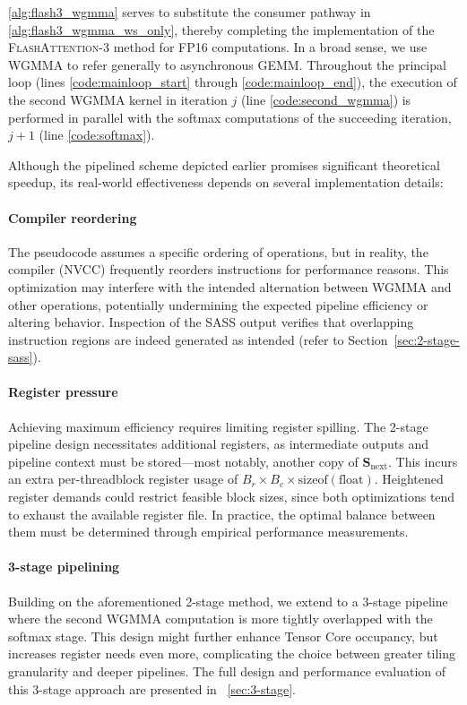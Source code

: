 \begin{enumerate}
\begin{algorithm}[H]
\begin{algorithmic}[1]
\cref{alg:flash3_wgmma} serves to substitute the consumer pathway in \cref{alg:flash3_wgmma_ws_only}, thereby completing the implementation of the \textsc{FlashAttention-3} method for FP16 computations. In a broad sense, we use WGMMA to refer generally to asynchronous GEMM. Throughout the principal loop (lines \ref{code:mainloop_start} through \ref{code:mainloop_end}), the execution of the second WGMMA kernel in iteration $j$ (line \ref{code:second_wgmma}) is performed in parallel with the softmax computations of the succeeding iteration, $j+1$ (line \ref{code:softmax}).

Although the pipelined scheme depicted earlier promises significant theoretical speedup, its real-world effectiveness depends on several implementation details:
\paragraph{Compiler reordering} The pseudocode assumes a specific ordering of operations, but in reality, the compiler (NVCC) frequently reorders instructions for performance reasons. This optimization may interfere with the intended alternation between WGMMA and other operations, potentially undermining the expected pipeline efficiency or altering behavior. Inspection of the SASS output verifies that overlapping instruction regions are indeed generated as intended (refer to Section~\ref{sec:2-stage-sass}).
\paragraph{Register pressure} Achieving maximum efficiency requires limiting register spilling. The 2-stage pipeline design necessitates additional registers, as intermediate outputs and pipeline context must be stored—most notably, another copy of $\mathbf{S}_{\mathrm{next}}$. This incurs an extra per-threadblock register usage of $B_r \times B_c \times \text{sizeof}(\text{float})$. Heightened register demands could restrict feasible block sizes, since both optimizations tend to exhaust the available register file. In practice, the optimal balance between them must be determined through empirical performance measurements.
\paragraph{3-stage pipelining} Building on the aforementioned 2-stage method, we extend to a 3-stage pipeline where the second WGMMA computation is more tightly overlapped with the softmax stage. This design might further enhance Tensor Core occupancy, but increases register needs even more, complicating the choice between greater tiling granularity and deeper pipelines. The full design and performance evaluation of this 3-stage approach are presented in ~\cref{sec:3-stage}.


\end{algorithmic}
\end{algorithm}
\end{enumerate}
